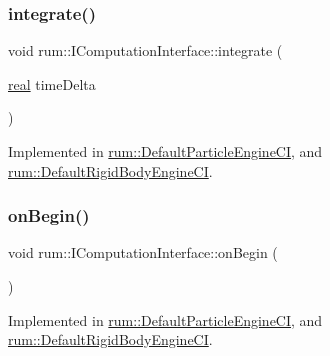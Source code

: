 \subsubsection{\texorpdfstring{integrate()}{integrate()}}
{\footnotesize\ttfamily void rum\+::\+I\+Computation\+Interface\+::integrate (\begin{DoxyParamCaption}\item[{\mbox{\hyperlink{namespacerum_a7e8cca23573d5eaead0f138cbaa4862c}{real}}}]{time\+Delta }\end{DoxyParamCaption})\hspace{0.3cm}{\ttfamily [pure virtual]}}



Implemented in \mbox{\hyperlink{classrum_1_1_default_particle_engine_c_i_a93e44a2355faaea31795206eb4ecbb86}{rum\+::\+Default\+Particle\+Engine\+CI}}, and \mbox{\hyperlink{classrum_1_1_default_rigid_body_engine_c_i_a881930b7e9637aa228a875fd9e376a5a}{rum\+::\+Default\+Rigid\+Body\+Engine\+CI}}.

\mbox{\label{classrum_1_1_i_computation_interface_a17f23c01b55d0ad7e0a13cbfd35a592c}} 
\subsubsection{\texorpdfstring{on\+Begin()}{onBegin()}}
{\footnotesize\ttfamily void rum\+::\+I\+Computation\+Interface\+::on\+Begin (\begin{DoxyParamCaption}{ }\end{DoxyParamCaption})\hspace{0.3cm}{\ttfamily [pure virtual]}}



Implemented in \mbox{\hyperlink{classrum_1_1_default_particle_engine_c_i_a2f28a0930c60c5d2c0d0cf3904bd6d25}{rum\+::\+Default\+Particle\+Engine\+CI}}, and \mbox{\hyperlink{classrum_1_1_default_rigid_body_engine_c_i_a8babbc59b2094399ef2048bbe505332d}{rum\+::\+Default\+Rigid\+Body\+Engine\+CI}}.

\mbox{\label{classrum_1_1_i_computation_interface_afaec27e8a634cd95cfc3aaa3e4664178}} 
